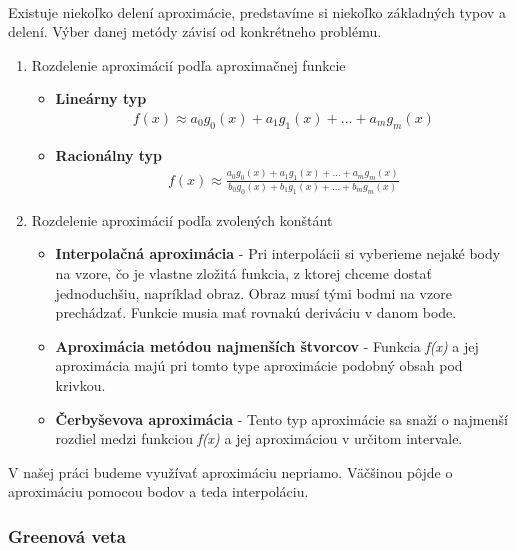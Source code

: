 \documentclass[12pt]{article}
\begin{document}
\paragraph{}
Existuje niekoľko delení aproximácie, predstavíme si niekoľko základných typov a delení. Výber danej metódy závisí od konkrétneho problému.
\begin{enumerate}
  \item Rozdelenie aproximácií podľa aproximačnej funkcie
	\begin{itemize}
	  \item \textbf{Lineárny typ}
		\begin{align*}
		f(x) \approx a_0 g_0(x) + a_1 g_1(x) + \ldots + a_m g_m(x)
		\end{align*}
	  \item \textbf{Racionálny typ}
	  	\begin{align*}
		f(x) \approx \frac{a_0 g_0(x) + a_1 g_1(x) + \ldots + a_m g_m(x)}{b_0 g_0(x) + b_1 g_1(x) + \ldots + b_m g_m(x)}
		\end{align*}
	\end{itemize}
  \item Rozdelenie aproximácií podľa zvolených konštánt
  	\begin{itemize}
	  \item 
	  	\textbf{Interpolačná aproximácia} - Pri interpolácii si vyberieme nejaké body na vzore, čo je vlastne zložitá funkcia, z ktorej chceme dostať jednoduchšiu, napríklad obraz.
	  	Obraz musí tými bodmi na vzore prechádzať. Funkcie musia mať rovnakú deriváciu v danom bode.
	  \item 
	  	\textbf{Aproximácia metódou najmenších štvorcov} - Funkcia \emph{f(x)} a jej aproximácia majú pri tomto type aproximácie podobný obsah pod krivkou.
	  \item 
	  	\textbf{Čerbyševova aproximácia} - Tento typ aproximácie sa snaží o najmenší rozdiel medzi funkciou \emph{f(x)} a jej aproximáciou v určitom intervale.
	\end{itemize}
\end{enumerate}
V našej práci budeme využívať aproximáciu nepriamo. Väčšinou pôjde o aproximáciu pomocou bodov a teda interpoláciu.
\cite{aproximacia}
\subsubsection{Greenová veta}
\end{document}
